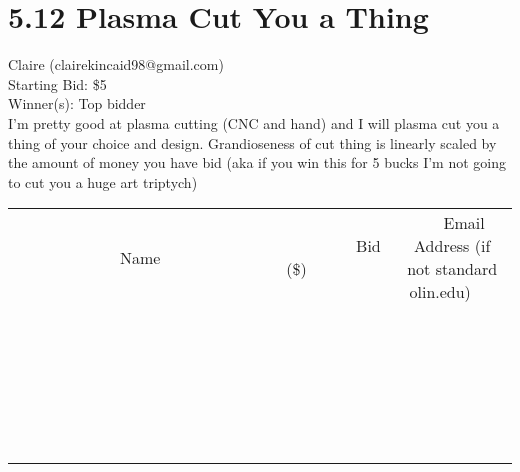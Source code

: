 \documentclass[11pt]{article}
\begin{document}
\section*{5.12 Plasma Cut You a Thing}
Claire (clairekincaid98@gmail.com) \\
Starting Bid: \$5 \\
Winner(s): 
Top bidder \\
I'm pretty good at plasma cutting (CNC and hand) and I will plasma cut you a thing of your choice and design.  Grandioseness of cut thing is linearly scaled by the amount of money you have bid (aka if you win this for 5 bucks I'm not going to cut you a huge art triptych) \\[6ex]
\begin{tabular}{c c c}
~~~~~~~~~~~~~Name~~~~~~~~~~~~~ & ~~~~~~~~~Bid (\$)~~~~~~~~~ & ~~~Email Address (if not standard olin.edu)~~~ \\
 & & \\
\hline
 & & \\
\hline
 & & \\
\hline
 & & \\
\hline
 & & \\
\hline
 & & \\
\hline
 & & \\
\hline
 & & \\
\hline
 & & \\
\hline
 & & \\
\hline
 & & \\
\hline
 & & \\
\hline
 & & \\
\hline
 & & \\
\hline
 & & \\
\hline
 & & \\
\hline
 & & \\
\hline
 & & \\
\hline
 & & \\
\hline
 & & \\
\hline
 & & \\
\hline
 & & \\
\hline
 & & \\
\hline
 & & \\
\hline
 & & \\
\hline
 & & \\
\hline
\end{tabular}
\clearpage
\end{document}

